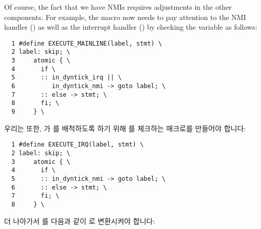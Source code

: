 Of course, the fact that we have NMIs requires adjustments in
the other components.
For example, the  macro now needs to
pay attention to the NMI handler () as well
as the interrupt handler () by checking
the  variable as follows:
\fi

{ \scriptsize
\begin{verbatim}
  1 #define EXECUTE_MAINLINE(label, stmt) \
  2 label: skip; \
  3     atomic { \
  4       if \
  5       :: in_dyntick_irq || \
  6          in_dyntick_nmi -> goto label; \
  7       :: else -> stmt; \
  8       fi; \
  9     } \
\end{verbatim}
}

우리는 또한,  가  를 배척하도록 하기 위해
\co{in_dyntick_nmi} 를 체크하는  매크로를 만들어야 합니다:
\iffalse

We will also need to introduce an 
macro that checks \co{in_dyntick_nmi} in order to allow
 to exclude \co{dyntick_nmi()}:
\fi

{ \scriptsize
\begin{verbatim}
  1 #define EXECUTE_IRQ(label, stmt) \
  2 label: skip; \
  3     atomic { \
  4       if \
  5       :: in_dyntick_nmi -> goto label; \
  6       :: else -> stmt; \
  7       fi; \
  8     } \
\end{verbatim}
}

더 나아가서 \co{dyntick_irq()} 를 다음과 같이 \co{EXECUTE_IRQ()} 로 변환시켜야
합니다:
\iffalse

It is further necessary to convert \co{dyntick_irq()}
to \co{EXECUTE_IRQ()} as follows:
\fi

